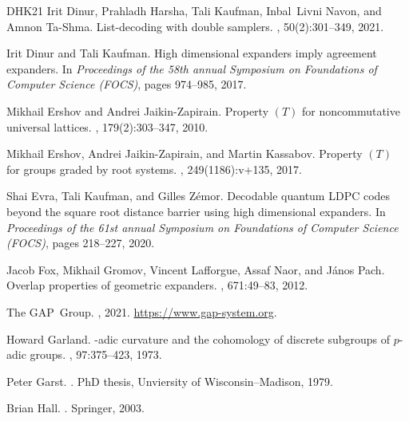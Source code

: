 \documentclass[10pt,a4paper]{article}
\theoremstyle{definition}
\begin{document}
\begin{thebibliography}{DHK{\etalchar{+}}21}
Irit Dinur, Prahladh Harsha, Tali Kaufman, Inbal~Livni Navon, and Amnon
  Ta-Shma.
\newblock List-decoding with double samplers.
, 50(2):301--349, 2021.

Irit Dinur and Tali Kaufman.
\newblock High dimensional expanders imply agreement expanders.
\newblock In {\em Proceedings of the 58th annual Symposium on Foundations of
  Computer Science (FOCS)}, pages 974--985, 2017.

Mikhail Ershov and Andrei Jaikin{-}Zapirain.
\newblock Property {$(T)$} for noncommutative universal lattices.
, 179(2):303--347, 2010.

Mikhail Ershov, Andrei Jaikin{-}Zapirain, and Martin Kassabov.
\newblock Property {$(T)$} for groups graded by root systems.
, 249(1186):v+135,
  2017.

Shai Evra, Tali Kaufman, and Gilles Z\'{e}mor.
\newblock Decodable quantum {LDPC} codes beyond the square root distance
  barrier using high dimensional expanders.
\newblock In {\em Proceedings of the 61st annual Symposium on Foundations of
  Computer Science (FOCS)}, pages 218--227, 2020.

Jacob Fox, Mikhail Gromov, Vincent Lafforgue, Assaf Naor, and J\'{a}nos Pach.
\newblock Overlap properties of geometric expanders.
, 671:49--83, 2012.

The GAP~Group.
,
  2021.
\newblock \url{https://www.gap-system.org}.

Howard Garland.
-adic curvature and the cohomology of discrete subgroups of
  {$p$}-adic groups.
, 97:375--423, 1973.

Peter Garst.
.
\newblock PhD thesis, Unviersity of Wisconsin--Madison, 1979.

Brian Hall.
.
\newblock Springer, 2003.


\end{thebibliography}
\end{document}
